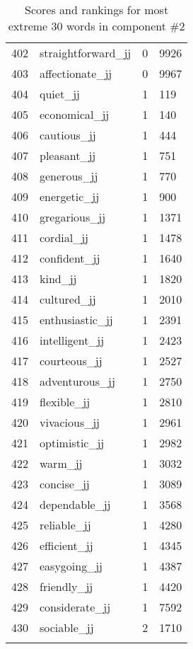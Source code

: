 \begin{longtable}[!htbp]{| rlr@{.}l |}
    402 & straightforward\_jj & 0 & 9926 \\
    403 & affectionate\_jj & 0 & 9967 \\
    404 & quiet\_jj & 1 & 119 \\
    405 & economical\_jj & 1 & 140 \\
    406 & cautious\_jj & 1 & 444 \\
    407 & pleasant\_jj & 1 & 751 \\
    408 & generous\_jj & 1 & 770 \\
    409 & energetic\_jj & 1 & 900 \\
    410 & gregarious\_jj & 1 & 1371 \\
    411 & cordial\_jj & 1 & 1478 \\
    412 & confident\_jj & 1 & 1640 \\
    413 & kind\_jj & 1 & 1820 \\
    414 & cultured\_jj & 1 & 2010 \\
    415 & enthusiastic\_jj & 1 & 2391 \\
    416 & intelligent\_jj & 1 & 2423 \\
    417 & courteous\_jj & 1 & 2527 \\
    418 & adventurous\_jj & 1 & 2750 \\
    419 & flexible\_jj & 1 & 2810 \\
    420 & vivacious\_jj & 1 & 2961 \\
    421 & optimistic\_jj & 1 & 2982 \\
    422 & warm\_jj & 1 & 3032 \\
    423 & concise\_jj & 1 & 3089 \\
    424 & dependable\_jj & 1 & 3568 \\
    425 & reliable\_jj & 1 & 4280 \\
    426 & efficient\_jj & 1 & 4345 \\
    427 & easygoing\_jj & 1 & 4387 \\
    428 & friendly\_jj & 1 & 4420 \\
    429 & considerate\_jj & 1 & 7592 \\
    430 & sociable\_jj & 2 & 1710 \\
    \hline
    \caption{Scores and rankings for most extreme 30 words in component \#2} \\
\end{longtable}
